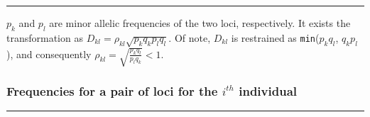 \documentclass[]{article}
\begin{document}
\begin{center}\rule{0.5\linewidth}{0.5pt}\end{center}

\(p_k\) and \(p_l\) are minor allelic frequencies of the two loci,
respectively. It exists the transformation as
\(D_{kl}=\rho_{kl}\sqrt{p_kq_kp_lq_l}\). Of note, \(D_{kl}\) is
restrained as \texttt{min}(\(p_kq_l\), \(q_kp_l\)), and consequently
\(\rho_{kl}=\sqrt{\frac{p_kq_l}{p_lq_k}}<1\).

\hypertarget{frequencies-for-a-pair-of-loci-for-the-ith-individual}{%
\subsubsection{\texorpdfstring{\textbf{Frequencies for a pair of loci
for the \(i^{th}\)
individual}}{Frequencies for a pair of loci for the i\^{}\{th\} individual}}\label{frequencies-for-a-pair-of-loci-for-the-ith-individual}}

\begin{center}\rule{0.5\linewidth}{0.5pt}\end{center}
\end{document}
